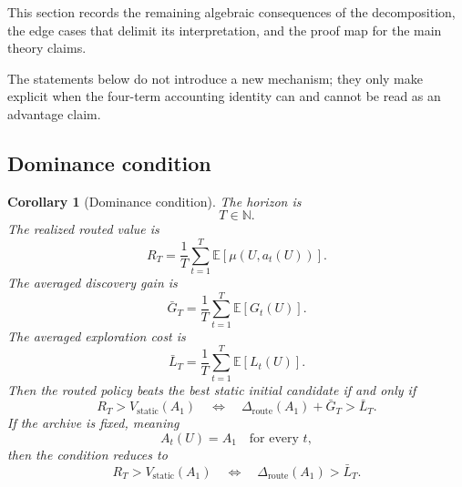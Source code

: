 \documentclass{article} %
\newtheorem{corollary}[theorem]{Corollary}
\begin{document}
This section records the remaining algebraic consequences of the decomposition, the edge cases that delimit its interpretation, and the proof map for the main theory claims.

The statements below do not introduce a new mechanism; they only make explicit when the four-term accounting identity can and cannot be read as an advantage claim.

\subsection{Dominance condition}

\begin{corollary}[Dominance condition]
\label{cor:app-dominance}
The horizon is
\begin{equation}
\label{eq:app-fourth-dom-t}
T\in\mathbb{N}.
\end{equation}
The realized routed value is
\begin{equation}
\label{eq:app-fourth-dom-rt}
R_T
=
\frac{1}{T}
\sum_{t=1}^{T}
\mathbb{E}[\mu(U,a_t(U))].
\end{equation}
The averaged discovery gain is
\begin{equation}
\label{eq:app-fourth-dom-gbar}
\bar G_T
=
\frac{1}{T}
\sum_{t=1}^{T}
\mathbb{E}[G_t(U)].
\end{equation}
The averaged exploration cost is
\begin{equation}
\label{eq:app-fourth-dom-lbar}
\bar L_T
=
\frac{1}{T}
\sum_{t=1}^{T}
\mathbb{E}[L_t(U)].
\end{equation}
Then the routed policy beats the best static initial candidate if and only if
\begin{equation}
\label{eq:app-fourth-dom-iff}
R_T
>
V_{\mathrm{static}}(A_1)
\quad\Longleftrightarrow\quad
\Delta_{\mathrm{route}}(A_1)+\bar G_T>\bar L_T.
\end{equation}
If the archive is fixed, meaning
\begin{equation}
\label{eq:app-fourth-dom-fixed}
A_t(U)=A_1
\quad
\text{for every }t,
\end{equation}
then the condition reduces to
\begin{equation}
\label{eq:app-fourth-dom-fixed-iff}
R_T
>
V_{\mathrm{static}}(A_1)
\quad\Longleftrightarrow\quad
\Delta_{\mathrm{route}}(A_1)>\bar L_T.
\end{equation}
\end{corollary}
\end{document}
